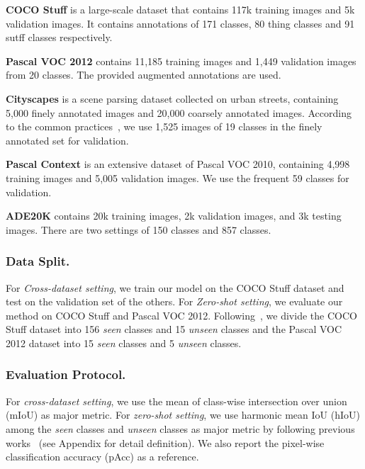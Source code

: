 \documentclass[runningheads]{llncs}
\begin{document}
\noindent\textbf{COCO Stuff} is a large-scale dataset that contains 117k training images and 5k validation images. It contains annotations of 171 classes, 80 thing classes and 91 sutff classes respectively.


\noindent\textbf{Pascal VOC 2012} contains 11,185 training images and 1,449 validation images from 20 classes. The provided augmented annotations are used. 


\noindent\textbf{Cityscapes} is a scene parsing dataset collected on urban streets, containing 5,000 finely annotated images and 20,000 coarsely annotated images. According to the common practices~\cite{cordts2016cityscapes}, we use 1,525 images of 19 classes in the finely annotated set for validation.


\noindent\textbf{Pascal Context} is an extensive dataset of Pascal VOC 2010, containing 4,998 training images and 5,005 validation images. We use the frequent 59 classes for validation.


\noindent\textbf{ADE20K} contains 20k training images, 2k validation images, and 3k testing images. There are two settings of 150 classes and 857 classes.

\subsubsection{Data Split.} 
For \emph{Cross-dataset setting}, we train our model on the COCO Stuff dataset and test on the validation set of the others. 
For \emph{Zero-shot setting}, we evaluate our method on COCO Stuff and Pascal VOC 2012. Following~\cite{xian2019semantic}, we divide the COCO Stuff dataset into 156 \emph{seen} classes and 15 \emph{unseen} classes and the Pascal VOC 2012 dataset into 15 \emph{seen} classes and 5 \emph{unseen} classes. 


\subsubsection{Evaluation Protocol.} 
For \emph{cross-dataset setting}, we use the mean of class-wise intersection over union (mIoU) as major metric. For \emph{zero-shot setting}, we use harmonic mean IoU (hIoU) among the \emph{seen} classes and \emph{unseen} classes as major metric by following previous works~\cite{xian2019semantic,pastore2021closer} (see Appendix for detail definition). We also report the pixel-wise classification accuracy (pAcc) as a reference. 
\end{document}
